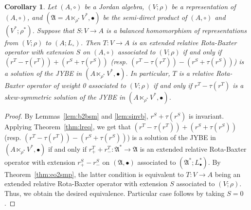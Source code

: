\documentclass[12pt, reqno, a4paper]{amsart}
\newtheorem{corollary}[theorem]{Corollary}
\theoremstyle{definition}
\begin{document}
\begin{corollary}\label{cor:tsc}
	Let $(A, \circ)$ be a Jordan algebra, $(V; \rho)$ be a representation of $(A, \circ)$, and $(\mathfrak{A} = A \ltimes_{\rho^*} V^*, \bullet)$ be the semi-direct product of $(A, \circ)$ and $(V^*; \rho^*)$.
	Suppose that $S: V \to A$ is a balanced homomorphism of representations from $(V; \rho)$ to $(A; L_{\circ})$.
	Then $T: V \to A$ is an extended relative Rota-Baxter operator with extension $S$ on $(A, \circ)$ associated to $(V; \rho)$ if and only if $(r^T - \tau(r^T)) + (r^S + \tau(r^S))$ (resp. $(r^T - \tau(r^T)) - (r^S + \tau(r^S))$) is a solution of the JYBE in $(A \ltimes_{\rho^*} V^*, \bullet)$.
	In particular, $T$ is a relative Rota-Baxter operator of weight 0 associated to $(V; \rho)$ if and only if $r^T - \tau(r^T)$ is a skew-symmetric solution of the JYBE in $(A \ltimes_{\rho^*} V^*, \bullet)$.
\end{corollary}
\begin{proof}
	By Lemmas~\ref{lem:b2bsm} and \ref{lem:sinvb}, $r^S + \tau(r^S)$ is invariant.
	Applying Theorem~\ref{thm:lreq}, we get that $(r^T - \tau(r^T)) + (r^S + \tau(r^S))$ (resp. $(r^T - \tau(r^T)) - (r^S + \tau(r^S))$) is a solution of the JYBE in $(A \ltimes_{\rho^*} V^*, \bullet)$ if and only if $r_{+}^{T} + r_{-}^{T}: \mathfrak{A}^* \to \mathfrak{A}$ is an extended relative Rota-Baxter operator with extension $r_{+}^{S} - r_{-}^{S}$ on $(\mathfrak{A}, \bullet)$ associated to $(\mathfrak{A}^*; L_{\bullet}^*)$.
	By Theorem~\ref{thm:eo2smp}, the latter condition is equivalent to $T: V \to A$ being an extended relative Rota-Baxter operator with extension $S$ associated to $(V; \rho)$.
	Thus, we obtain the desired equivalence.
	Particular case follows by taking $S = 0$.
\end{proof}
\end{document}
